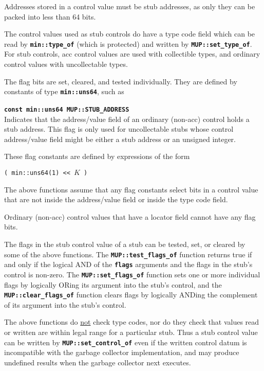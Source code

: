 \documentclass[12pt]{article}
\makeatletter
\newcommand{\TT}[1]{{\tt \bfseries #1}}
\newcommand{\ttindex}[1]{\index{#1@{\tt #1}}}
\newenvironment{indpar}[1][0.3in]%
	{\begin{list}{}%
		     {\setlength{\itemsep}{0in}%
		      \setlength{\topsep}{0in}%
		      \setlength{\parsep}{1ex}%
		      \setlength{\labelwidth}{#1}%
		      \setlength{\leftmargin}{#1}%
		      \addtolength{\leftmargin}{\labelsep}}%
	 \item}%
	{\end{list}}
\newcommand{\LABEL}[1]{\label{#1}}
\newcommand{\MUPKEY}[1]%
	   {\TT{#1}\ttindex{MUP::#1}\ttindex{#1}}
\makeatother
\begin{document}
Addresses stored in a control value must be stub addresses, as only they
can be packed into less than 64 bits.

The control values used as stub controls do have a type code field which
can be read by \TT{min::type\_of} (which is protected) and
written by \TT{MUP::set\_type\_of}.  For stub controls,
acc control values are used with
collectible types, and ordinary control values with
uncollectable types.

The flag bits are set, cleared, and tested individually.  They are
defined by constants of type \TT{min::uns64}, such as

\begin{indpar}
\begin{list}{}{}
\item[\TT{const min::uns64 MUP::}\MUPKEY{STUB\_ADDRESS}]~%
	\LABEL{MIN::STUB_ADDRESS}\\
Indicates that the address/value field of an ordinary (non-acc)
control holds a stub address.  This flag is only used for
uncollectable stubs whose control address/value field might
be either a stub address or an unsigned integer.
\end{list}
\end{indpar}

These flag constants are defined by expressions of the form

\begin{center}
\verb|( min::uns64(1) << |$K$\verb| )|
\end{center}

The above functions assume that any flag constants select bits
in a control value that are not inside the address/value field
or inside the type code field.

Ordinary (non-acc) control values that have a locator
field cannot have any flag bits.

The flags in the stub control value of a stub can be tested, set, or
cleared by some of the above functions.
The \TT{MUP::test\_flags\_of} function
returns true if and only if the logical AND of the \TT{flags} arguments
and the flags in the stub's control is non-zero.  The \TT{MUP::set\_flags\_of}
function sets one or more individual flags by logically ORing its
argument into the stub's control, and the
\TT{MUP::clear\_flags\_of} function clears flags by logically ANDing
the complement of its argument into the stub's control.

The above functions do \underline{not} check type codes, nor do they check
that values read or written are within legal range for a particular
stub.  Thus a stub control value
can be written by \TT{MUP::set\_control\_of} even if the written
control datum is incompatible with the garbage collector implementation,
and may produce undefined results when the garbage collector
next executes.
\end{document}
